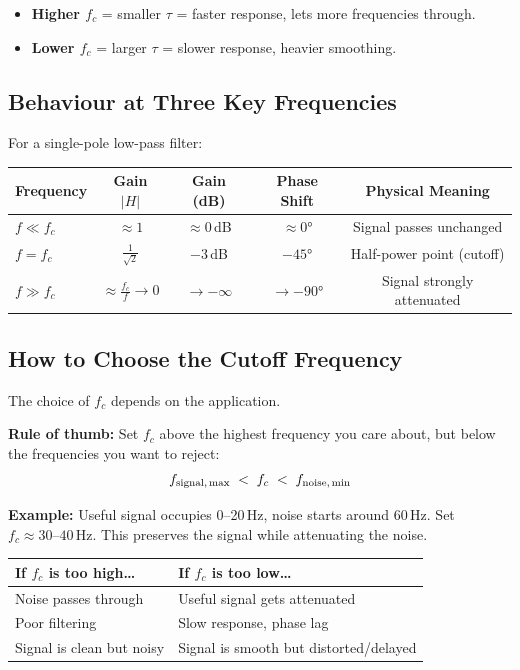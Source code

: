 \documentclass[12pt,a4paper]{article}
\begin{document}
\begin{itemize}
    \item \textbf{Higher $f_c$} = smaller $\tau$ = faster response, lets more frequencies through.
    \item \textbf{Lower $f_c$} = larger $\tau$ = slower response, heavier smoothing.
\end{itemize}

\subsection{Behaviour at Three Key Frequencies}

For a single-pole low-pass filter:

\begin{center}
\begin{tabular}{lcccc}
    \toprule
    \textbf{Frequency} & \textbf{Gain $|H|$} & \textbf{Gain (dB)} & \textbf{Phase Shift} & \textbf{Physical Meaning} \\
    \midrule
    $f \ll f_c$  & $\approx 1$                    & $\approx 0$\,dB     & $\approx 0°$  & Signal passes unchanged \\
    $f = f_c$    & $\frac{1}{\sqrt{2}}$           & $-3$\,dB            & $-45°$        & Half-power point (cutoff) \\
    $f \gg f_c$  & $\approx \frac{f_c}{f} \to 0$  & $\to -\infty$       & $\to -90°$    & Signal strongly attenuated \\
    \bottomrule
\end{tabular}
\end{center}

\subsection{How to Choose the Cutoff Frequency}

The choice of $f_c$ depends on the application.

\textbf{Rule of thumb:} Set $f_c$ above the highest frequency you care about, but below the frequencies you want to reject:
\begin{equation}
    f_{\text{signal,\,max}} \;<\; f_c \;<\; f_{\text{noise,\,min}}
\end{equation}

\textbf{Example:} Useful signal occupies 0--20\,Hz, noise starts around 60\,Hz. Set $f_c \approx 30\text{--}40$\,Hz. This preserves the signal while attenuating the noise.

\begin{center}
\begin{tabular}{ll}
    \toprule
    \textbf{If $f_c$ is too high\ldots} & \textbf{If $f_c$ is too low\ldots} \\
    \midrule
    Noise passes through             & Useful signal gets attenuated \\
    Poor filtering                   & Slow response, phase lag \\
    Signal is clean but noisy        & Signal is smooth but distorted/delayed \\
    \bottomrule
\end{tabular}
\end{center}
\end{document}

